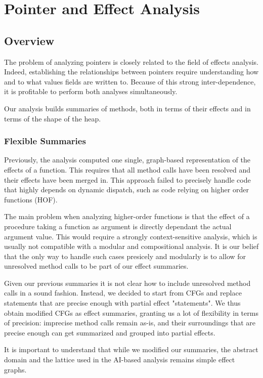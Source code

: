 \documentclass[a4paper]{article}
\begin{document}
\section{Pointer and Effect Analysis}
\subsection{Overview}
The problem of analyzing pointers is closely related to the field of effects
analysis. Indeed, establishing the relationships between pointers require
understanding how and to what values fields are written to. Because of this
strong inter-dependence, it is profitable to perform both analyses simultaneously.

Our analysis builds summaries of methods, both in terms of their effects and in
terms of the shape of the heap.

\subsubsection{Flexible Summaries}
Previously, the analysis computed one single, graph-based representation of the
effects of a function. This requires that all method calls have been resolved
and their effects have been merged in. This approach failed to precisely handle
code that highly depends on dynamic dispatch, such as code relying on higher
order functions (HOF).

The main problem when analyzing higher-order functions is that the effect of a
procedure taking a function as argument is directly dependant the actual
argument value. This would require a strongly context-sensitive analysis, which
is usually not compatible with a modular and compositional analysis. It is our
belief that the only way to handle such cases presicely and modularly is to
allow for unresolved method calls to be part of our effect summaries.

Given our previous summaries it is not clear how to include unresolved method
calls in a sound fashion. Instead, we decided to start from CFGs and replace
statements that are precise enough with partial effect "statements". We thus
obtain modified CFGs as effect summaries, granting us a lot of flexibility in
terms of precision: imprecise method calls remain as-is, and their surroundings
that are precise enough can get summarized and grouped into partial effects.

It is important to understand that while we modified our summaries, the
abstract domain and the lattice used in the AI-based analysis remains simple
effect graphs.
\end{document}
